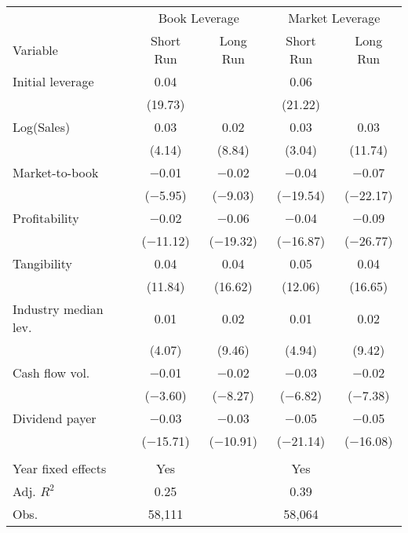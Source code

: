 \begin{tabular}{l*{4}{c}}
\toprule
 & \multicolumn{2}{c}{Book Leverage} & \multicolumn{2}{c}{Market Leverage} \\ \cmidrule(lr){2-3} \cmidrule(lr){4-5}
Variable & Short Run & Long Run & Short Run & Long Run \\ \midrule
Initial leverage&        0.04&            &        0.06&            \\
            &     (19.73)&            &     (21.22)&            \\
\addlinespace
Log(Sales)  &        0.03&        0.02&        0.03&        0.03\\
            &      (4.14)&      (8.84)&      (3.04)&     (11.74)\\
\addlinespace
Market-to-book&     $-$0.01&     $-$0.02&     $-$0.04&     $-$0.07\\
            &   ($-$5.95)&   ($-$9.03)&  ($-$19.54)&  ($-$22.17)\\
\addlinespace
Profitability&     $-$0.02&     $-$0.06&     $-$0.04&     $-$0.09\\
            &  ($-$11.12)&  ($-$19.32)&  ($-$16.87)&  ($-$26.77)\\
\addlinespace
Tangibility &        0.04&        0.04&        0.05&        0.04\\
            &     (11.84)&     (16.62)&     (12.06)&     (16.65)\\
\addlinespace
Industry median lev.&        0.01&        0.02&        0.01&        0.02\\
            &      (4.07)&      (9.46)&      (4.94)&      (9.42)\\
\addlinespace
Cash flow vol.&     $-$0.01&     $-$0.02&     $-$0.03&     $-$0.02\\
            &   ($-$3.60)&   ($-$8.27)&   ($-$6.82)&   ($-$7.38)\\
\addlinespace
Dividend payer&     $-$0.03&     $-$0.03&     $-$0.05&     $-$0.05\\
            &  ($-$15.71)&  ($-$10.91)&  ($-$21.14)&  ($-$16.08)\\
\\
Year fixed effects&         Yes&            &         Yes&            \\
Adj. $ R^2$ &        0.25&            &        0.39&            \\
Obs.        &      58,111&            &      58,064&            \\
\bottomrule
\end{tabular}
